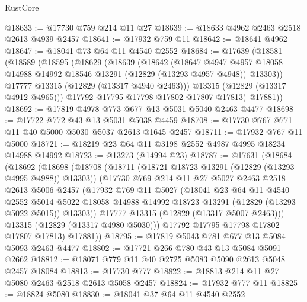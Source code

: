 \begin{lexlean}{RustCore}
\begin{coremodule}
@18633 := @17730 @759 @214 @11 @27
@18639 := @18633 @4962 @2463 @2518 @2613 @4939 @2457
@18641 := @17932 @759 @11
@18642 := @18641 @4962
@18647 := @18041 @73 @64 @11 @4540 @2552
@18684 := @17639
    (@18581
      (@18589
        (@18595
          (@18629
            (@18639
              (@18642
                (@18647
                  @4947
                  @4957
                  @18058
                  @14988
                  @14992
                  @18546
                  @13291
                  (@12829 (@13293 @4957 @4948))
                  @13303))
              @17777
              @13315
              (@12829 (@13317 @4940 @2463)))
            @13315
            (@12829 (@13317 @4912 @4965)))
          @17792
          @17795
          @17798
          @17802
          @17807
          @17813)
        @17881))
@18692 := @17819 @4978 @773 @677 @13 @5031 @5040 @2463 @4477
@18698 := @17722 @772 @43 @13 @5031 @5038 @4459
@18708 := @17730 @767 @771 @11 @40 @5000 @5030 @5037 @2613 @1645 @2457
@18711 := @17932 @767 @11 @5000
@18721 := @18219 @23 @64 @11 @3198 @2552 @4987 @4995 @18234 @14988 @14992
@18723 := @13273 (@14994 @23)
@18787 := @17631
    (@18684
      (@18692
        (@18698
          (@18708
            (@18711 (@18721 @18723 @13291 (@12829 (@13293 @4995 @4988)) @13303))
            (@17730
              @769
              @214
              @11
              @27
              @5027
              @2463
              @2518
              @2613
              @5006
              @2457
              (@17932
                @769
                @11
                @5027
                (@18041
                  @23
                  @64
                  @11
                  @4540
                  @2552
                  @5014
                  @5022
                  @18058
                  @14988
                  @14992
                  @18723
                  @13291
                  (@12829 (@13293 @5022 @5015))
                  @13303))
              @17777
              @13315
              (@12829 (@13317 @5007 @2463)))
            @13315
            (@12829 (@13317 @4980 @5030)))
          @17792
          @17795
          @17798
          @17802
          @17807
          @17813)
        @17881))
@18795 := @17819 @5043 @781 @677 @13 @5084 @5093 @2463 @4477
@18802 := @17721 @266 @780 @43 @13 @5084 @5091 @2662
@18812 := @18071 @779 @11 @40 @2725 @5083 @5090 @2613 @5048 @2457 @18084
@18813 := @17730 @777
@18822 := @18813 @214 @11 @27 @5080 @2463 @2518 @2613 @5058 @2457
@18824 := @17932 @777 @11
@18825 := @18824 @5080
@18830 := @18041 @37 @64 @11 @4540 @2552

\end{coremodule}
\end{lexlean}
